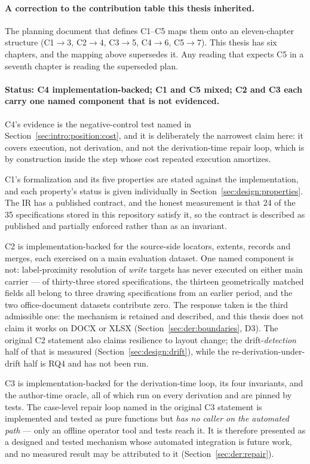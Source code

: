 \paragraph{A correction to the contribution table this thesis inherited.}
The planning document that defines C1--C5 maps them onto an eleven-chapter structure
(C1$\rightarrow$3, C2$\rightarrow$4, C3$\rightarrow$5, C4$\rightarrow$6, C5$\rightarrow$7).
This thesis has six chapters, and the mapping above supersedes it. Any reading that expects
C5 in a seventh chapter is reading the superseded plan.

\paragraph{Status: C4 implementation-backed; C1 and C5 mixed; C2 and C3 each carry one named
component that is not evidenced.}
C4's evidence is the negative-control test named in Section~\ref{sec:intro:position:cost}, and
it is deliberately the narrowest claim here: it covers execution, not derivation, and not the
derivation-time repair loop, which is by construction inside the step whose cost repeated
execution amortizes.

C1's formalization and its five properties are stated against the implementation, and each
property's status is given individually in Section~\ref{sec:design:properties}. The IR has a
published contract, and the honest measurement is that 24 of the 35 specifications stored in
this repository satisfy it, so the contract is described as published and partially enforced
rather than as an invariant.

C2 is implementation-backed for the source-side locators, extents, records and merges, each
exercised on a main evaluation dataset. One named component is not: label-proximity resolution
of \emph{write} targets has never executed on either main carrier --- of thirty-three stored
specifications, the thirteen geometrically matched fields all belong to three drawing
specifications from an earlier period, and the two office-document datasets contribute zero.
The response taken is the third admissible one: the mechanism is retained and described, and
this thesis does not claim it works on DOCX or XLSX (Section~\ref{sec:der:boundaries}, D3).
The original C2 statement also claims resilience to layout change; the drift-\emph{detection}
half of that is measured (Section~\ref{sec:design:drift}), while the
re-derivation-under-drift half is RQ4 and has not been run.

C3 is implementation-backed for the derivation-time loop, its four invariants, and the
author-time oracle, all of which run on every derivation and are pinned by tests. The
case-level repair loop named in the original C3 statement is implemented and tested as pure
functions but \emph{has no caller on the automated path} --- only an offline operator tool and
tests reach it. It is therefore presented as a designed and tested mechanism whose automated
integration is future work, and no measured result may be attributed to it
(Section~\ref{sec:der:repair}).

